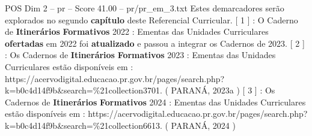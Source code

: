 \begin{textsample}{POS Dim 2 – pr – Score 41.00 – pr/pr\_em\_3.txt}
Estes demarcadores serão explorados no segundo \textbf{capítulo} deste Referencial Curricular. [ 1 ] : O Caderno de \textbf{Itinerários} \textbf{Formativos} 2022 : Ementas das Unidades Curriculares \textbf{ofertadas} em 2022 foi \textbf{atualizado} e passou a integrar os Cadernos de 2023. [ 2 ] : Os Cadernos de \textbf{Itinerários} \textbf{Formativos} 2023 : Ementas das Unidades Curriculares estão disponíveis em : https://acervodigital.educacao.pr.gov.br/pages/search.php? k=b0c4d14f9b\&search=\%21collection3701. ( PARANÁ, 2023a ) [ 3 ] : Os Cadernos de \textbf{Itinerários} \textbf{Formativos} 2024 : Ementas das Unidades Curriculares estão disponíveis em : https://acervodigital.educacao.pr.gov.br/pages/search.php? k=b0c4d14f9b\&search=\%21collection6613. ( PARANÁ, 2024 )

\end{textsample}
